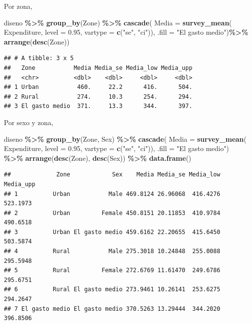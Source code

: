 \documentclass[
  spanish,
  12pt,
]{book}
\newenvironment{Shaded}{\begin{snugshade}}{\end{snugshade}}
\newcommand{\AttributeTok}[1]{\textcolor[rgb]{0.13,0.29,0.53}{#1}}
\newcommand{\FloatTok}[1]{\textcolor[rgb]{0.00,0.00,0.81}{#1}}
\newcommand{\FunctionTok}[1]{\textcolor[rgb]{0.13,0.29,0.53}{\textbf{#1}}}
\newcommand{\NormalTok}[1]{#1}
\newcommand{\SpecialCharTok}[1]{\textcolor[rgb]{0.81,0.36,0.00}{\textbf{#1}}}
\newcommand{\StringTok}[1]{\textcolor[rgb]{0.31,0.60,0.02}{#1}}
\begin{document}
Por zona,

\begin{Shaded}
\begin{Highlighting}[]
\NormalTok{diseno }\SpecialCharTok{\%\textgreater{}\%} \FunctionTok{group\_by}\NormalTok{(Zone) }\SpecialCharTok{\%\textgreater{}\%}
  \FunctionTok{cascade}\NormalTok{(}
    \AttributeTok{Media =} \FunctionTok{survey\_mean}\NormalTok{(}
\NormalTok{      Expenditure, }\AttributeTok{level =} \FloatTok{0.95}\NormalTok{,}
       \AttributeTok{vartype =}  \FunctionTok{c}\NormalTok{(}\StringTok{"se"}\NormalTok{, }\StringTok{"ci"}\NormalTok{)),}
        \AttributeTok{.fill =} \StringTok{"El gasto medio"}\NormalTok{)}\SpecialCharTok{\%\textgreater{}\%}
  \FunctionTok{arrange}\NormalTok{(}\FunctionTok{desc}\NormalTok{(Zone))}
\end{Highlighting}
\end{Shaded}

\begin{verbatim}
## # A tibble: 3 x 5
##   Zone           Media Media_se Media_low Media_upp
##   <chr>          <dbl>    <dbl>     <dbl>     <dbl>
## 1 Urban           460.     22.2      416.      504.
## 2 Rural           274.     10.3      254.      294.
## 3 El gasto medio  371.     13.3      344.      397.
\end{verbatim}

Por sexo y zona,

\begin{Shaded}
\begin{Highlighting}[]
\NormalTok{diseno }\SpecialCharTok{\%\textgreater{}\%} \FunctionTok{group\_by}\NormalTok{(Zone, Sex) }\SpecialCharTok{\%\textgreater{}\%}
  \FunctionTok{cascade}\NormalTok{(}
    \AttributeTok{Media =} \FunctionTok{survey\_mean}\NormalTok{(}
\NormalTok{      Expenditure, }\AttributeTok{level =} \FloatTok{0.95}\NormalTok{,}
       \AttributeTok{vartype =}  \FunctionTok{c}\NormalTok{(}\StringTok{"se"}\NormalTok{, }\StringTok{"ci"}\NormalTok{)),}
        \AttributeTok{.fill =} \StringTok{"El gasto medio"}\NormalTok{) }\SpecialCharTok{\%\textgreater{}\%}
  \FunctionTok{arrange}\NormalTok{(}\FunctionTok{desc}\NormalTok{(Zone), }\FunctionTok{desc}\NormalTok{(Sex)) }\SpecialCharTok{\%\textgreater{}\%}
  \FunctionTok{data.frame}\NormalTok{()}
\end{Highlighting}
\end{Shaded}

\begin{verbatim}
##             Zone            Sex    Media Media_se Media_low Media_upp
## 1          Urban           Male 469.8124 26.96068  416.4276  523.1973
## 2          Urban         Female 450.8151 20.11853  410.9784  490.6518
## 3          Urban El gasto medio 459.6162 22.20655  415.6450  503.5874
## 4          Rural           Male 275.3018 10.24848  255.0088  295.5948
## 5          Rural         Female 272.6769 11.61470  249.6786  295.6751
## 6          Rural El gasto medio 273.9461 10.26141  253.6275  294.2647
## 7 El gasto medio El gasto medio 370.5263 13.29444  344.2020  396.8506
\end{verbatim}
\end{document}

